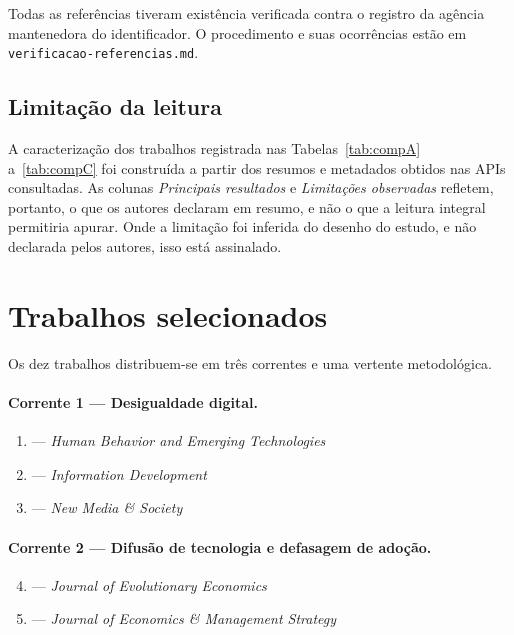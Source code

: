 \documentclass[12pt,a4paper]{article}
\begin{document}
\begin{sloppypar}
Todas as referências tiveram existência verificada contra o registro da agência
mantenedora do identificador. O procedimento e suas ocorrências estão em
\texttt{verificacao-referencias.md}.
\end{sloppypar}

\subsection{Limitação da leitura}

A caracterização dos trabalhos registrada nas Tabelas~\ref{tab:compA} a~\ref{tab:compC} foi
construída a partir dos resumos e metadados obtidos nas APIs consultadas. As colunas
\emph{Principais resultados} e \emph{Limitações observadas} refletem, portanto, o que
os autores declaram em resumo, e não o que a leitura integral permitiria apurar. Onde
a limitação foi inferida do desenho do estudo, e não declarada pelos autores, isso
está assinalado.

\section{Trabalhos selecionados}

Os dez trabalhos distribuem-se em três correntes e uma vertente metodológica.

\paragraph{Corrente 1 --- Desigualdade digital.}
\begin{enumerate}
  \item \textcite{lutz2019} --- \emph{Human Behavior and Emerging Technologies}
  \item \textcite{mannuru2023} --- \emph{Information Development}
  \item \textcite{wang2024} --- \emph{New Media \& Society}
\end{enumerate}

\paragraph{Corrente 2 --- Difusão de tecnologia e defasagem de adoção.}
\begin{enumerate}\setcounter{enumi}{3}
  \item \textcite{knez2023} --- \emph{Journal of Evolutionary Economics}
  \item \textcite{mcelheran2024} --- \emph{Journal of Economics \& Management Strategy}
\end{enumerate}
\end{document}
